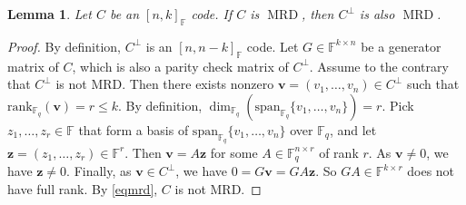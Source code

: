 \documentclass[11pt]{article}
\newif\ifmynotes
\newcommand{\ZGnote}[1]{\ifmynotes\textcolor{purple}{[Zeyu: #1]}\else\fi}
\newcommand{\CYnote}[1]{\ifmynotes\textcolor{orange}{[Chen: #1]}\else\fi}
\theoremstyle{plain}
\newtheorem{lemma}[thm]{Lemma}
\theoremstyle{definition}
\newtheorem{defn}[thm]{Definition}
\theoremstyle{remark}
\newcommand{\F}{\mathbb{F}}
\newcommand{\spa}{\mathrm{span}}
\newcommand{\bv}{\bm{v}}
\newcommand{\bu}{\bm{u}}
\newcommand{\bx}{\bm{x}}
\newcommand{\bz}{\bm{z}}
\newcommand{\bc}{\bm{c}}
\newcommand{\rank}{\mathrm{rank}}
\begin{document}
%
%



\begin{lemma}\label{prop:dualmrd}
Let $C$ be an $[n,k]_{\F}$ code. If $C$ is $\operatorname{MRD}$, then $C^\perp$ is also $\operatorname{MRD}$.
\end{lemma}

\begin{proof}
By definition, $C^\perp$ is an $[n,n-k]_{\F}$ code. Let $G\in\F^{k\times n}$ be a generator matrix of $C$, which is also a parity check matrix of $C^{\perp}$. Assume to the contrary that $C^{\perp}$ is not MRD. Then there exists nonzero $\bv=(v_1,\dots,v_n)\in C^{\perp}$ such that $\rank_{\F_q}(\bv)=r\leq k$. 
By definition, $\dim_{\F_q}(\spa_{\F_q}\{v_1,\ldots,v_n\})=r$.
Pick $z_1,\dots,z_r\in \F$ that form a basis of $\spa_{\F_q}\{v_1,\ldots,v_n\}$ over $\F_q$, and let $\bz=(z_1,\dots,z_r)\in \F^r$.
Then $\bv=A\bz$ for some $A\in\F_q^{n\times r}$ of rank $r$.
As $\bv\neq 0$, we have $\bz\neq 0$.
Finally, as $\bv\in C^\perp$, we have $0=G\bv=GA \bz$. So $GA\in \F^{k\times r}$ does not have full rank. By \cref{eqmrd}, $C$ is not MRD.
\end{proof}
\end{document}
